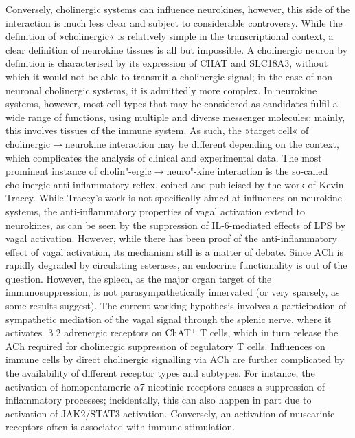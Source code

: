 Conversely, cholinergic systems can influence neurokines, however, this side of the interaction is much less clear and subject to considerable controversy. While the definition of »cholinergic« is relatively simple in the transcriptional context, a clear definition of neurokine tissues is all but impossible. A cholinergic neuron by definition is characterised by its expression of CHAT and SLC18A3, without which it would not be able to transmit a cholinergic signal; in the case of non-neuronal cholinergic systems, it is admittedly more complex. In neurokine systems, however, most cell types that may be considered as candidates fulfil a wide range of functions, using multiple and diverse messenger molecules; mainly, this involves tissues of the immune system. As such, the »target cell« of cholinergic$\to$neurokine interaction may be different depending on the context, which complicates the analysis of clinical and experimental data. The most prominent instance of cholin"-ergic$\to$neuro"-kine interaction is the so-called cholinergic anti-inflammatory reflex, coined and publicised by the work of Kevin Tracey.\cite{Tracey2002} While Tracey's work is not specifically aimed at influences on neurokine systems, the anti-inflammatory properties of vagal activation extend to neurokines, as can be seen by the suppression of IL-6-mediated effects of LPS by vagal activation.\cite{Garcia-Oscos2015} However, while there has been proof of the anti-inflammatory effect of vagal activation, its mechanism still is a matter of debate. Since ACh is rapidly degraded by circulating esterases, an endocrine functionality is out of the question. However, the spleen, as the major organ target of the immunosuppression, is not parasympathetically innervated (or very sparsely, as some results suggest).\cite{} The current working hypothesis involves a participation of sympathetic mediation of the vagal signal through the splenic nerve, where it activates $\upbeta$2 adrenergic receptors on ChAT$^+$ T cells, which in turn release the ACh required for cholinergic suppression of regulatory T cells. Influences on immune cells by direct cholinergic signalling via ACh are further complicated by the availability of different receptor types and subtypes. For instance, the activation of homopentameric $\alpha$7 nicotinic receptors causes a suppression of inflammatory processes; incidentally, this can also happen in part due to activation of JAK2/STAT3 activation.\cite{Cui2010} Conversely, an activation of muscarinic receptors often is associated with immune stimulation.\cite{Razani-Boroujerdi2008}

